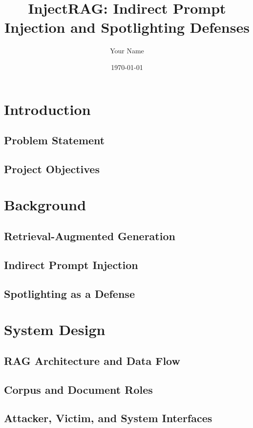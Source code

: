 \documentclass[11pt]{article}
\title{InjectRAG: Indirect Prompt Injection and Spotlighting Defenses}
\author{Your Name}
\date{\today}
\begin{document}
\maketitle

\begin{abstract}
\end{abstract}

\section{Introduction}
\subsection{Problem Statement}
\subsection{Project Objectives}

\section{Background}
\subsection{Retrieval-Augmented Generation}
\subsection{Indirect Prompt Injection}
\subsection{Spotlighting as a Defense}

\section{System Design}
\subsection{RAG Architecture and Data Flow}
\subsection{Corpus and Document Roles}
\subsection{Attacker, Victim, and System Interfaces}
\end{document}
